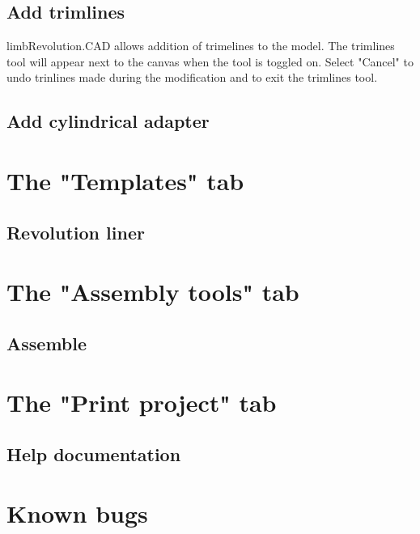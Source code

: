 \documentclass[twoside,a4paper]{refrep}
\begin{document}
	\subsection{Add trimlines}
	limbRevolution.CAD allows addition of trimelines to the model. The trimlines tool will appear next to the canvas when the tool is toggled on. Select "Cancel" to undo trinlines made during the modification and to exit the trimlines tool.
	\subsection{Add cylindrical adapter}
	\section{The "Templates" tab}
	\subsection{Revolution liner}
	\section{The "Assembly tools" tab}
	\subsection{Assemble}
	\section{The "Print project" tab}
	\subsection{Help documentation}
	\section{Known bugs}
	
%	
%		
%		
%		
%		
%		
\end{document}
